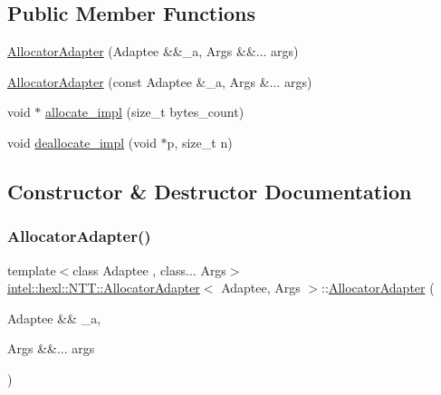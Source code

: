 \subsection*{Public Member Functions}
\begin{DoxyCompactItemize}
\item 
\hyperlink{structintel_1_1hexl_1_1NTT_1_1AllocatorAdapter_a4403f32f5ed5527a13c2bf12c20a68af}{Allocator\+Adapter} (Adaptee \&\&\+\_\+a, Args \&\&... args)
\item 
\hyperlink{structintel_1_1hexl_1_1NTT_1_1AllocatorAdapter_aee97fbd36cf2299db87f6dbe75f12396}{Allocator\+Adapter} (const Adaptee \&\+\_\+a, Args \&... args)
\item 
void $\ast$ \hyperlink{structintel_1_1hexl_1_1NTT_1_1AllocatorAdapter_a408a6a4b42aef1db5ab7e9b5c8ec2670}{allocate\+\_\+impl} (size\+\_\+t bytes\+\_\+count)
\item 
void \hyperlink{structintel_1_1hexl_1_1NTT_1_1AllocatorAdapter_a123aa02665ce9f2b219ca9b88164e114}{deallocate\+\_\+impl} (void $\ast$p, size\+\_\+t n)
\end{DoxyCompactItemize}


\subsection{Constructor \& Destructor Documentation}
\mbox{\label{structintel_1_1hexl_1_1NTT_1_1AllocatorAdapter_a4403f32f5ed5527a13c2bf12c20a68af}} 
\subsubsection{\texorpdfstring{Allocator\+Adapter()}{AllocatorAdapter()}\hspace{0.1cm}{\footnotesize\ttfamily [1/2]}}
{\footnotesize\ttfamily template$<$class Adaptee , class... Args$>$ \\
\hyperlink{structintel_1_1hexl_1_1NTT_1_1AllocatorAdapter}{intel\+::hexl\+::\+N\+T\+T\+::\+Allocator\+Adapter}$<$ Adaptee, Args $>$\+::\hyperlink{structintel_1_1hexl_1_1NTT_1_1AllocatorAdapter}{Allocator\+Adapter} (\begin{DoxyParamCaption}\item[{Adaptee \&\&}]{\+\_\+a,  }\item[{Args \&\&...}]{args }\end{DoxyParamCaption})\hspace{0.3cm}{\ttfamily [explicit]}}

